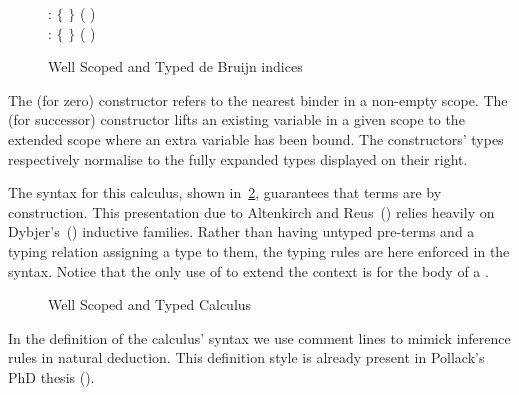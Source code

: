 \begin{figure}[h]
\begin{minipage}{0.5\textwidth}
\end{minipage}
\begin{minipage}{0.5\textwidth}
  \vspace*{\baselineskip}
   : { $\lbrace$ $\rbrace$ 
              ( \AIC{::} )}
  \\
   : { $\lbrace$  $\rbrace$ 
                  ( \AIC{::} )}
\end{minipage}
\caption{Well Scoped and Typed de Bruijn indices\label{fig:variable}}
\end{figure}

The  (for zero) constructor refers to the nearest binder in a
non-empty scope. The  (for successor) constructor lifts an
existing variable in a given scope to the extended scope where an
extra variable has been bound. The constructors' types respectively
normalise to the fully expanded types displayed on their right.

The syntax for this calculus, shown in~\cref{fig:term}, guarantees that
terms are \scopeandtypesafe{} by construction. This presentation due to
Altenkirch and Reus~(\citeyear{altenkirch1999monadic}) relies heavily on
Dybjer's~(\citeyear{dybjer1991inductive}) inductive families. Rather than
having untyped pre-terms and a typing relation assigning a type to
them, the typing rules are here enforced in the syntax. Notice that
the only use of  to extend the context is for the body of
a .

\begin{figure}[h]
\caption{Well Scoped and Typed Calculus\label{fig:term}}
\end{figure}

\begin{convention}
In the definition of the calculus' syntax we use comment lines to mimick
inference rules in natural deduction. This definition style is already
present in Pollack's PhD thesis (\citeyear{pollack1994}).
\end{convention}
